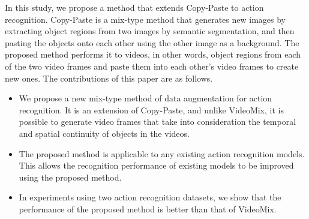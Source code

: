 In this study, we propose a method that extends Copy-Paste \cite{CopyPaste} to action recognition.
Copy-Paste is a mix-type method
that generates new images by extracting object regions from two images by semantic segmentation,
and then pasting the objects onto each other using the other image as a background.
The proposed method performs it to videos, in other words, object regions from each of the two video frames and paste them into each other's video frames to create new ones.
The contributions of this paper are as follows.
\begin{itemize}

\item We propose a new mix-type method of data augmentation for action recognition.
It is an extension of Copy-Paste, and unlike VideoMix, it is possible to generate video frames that take into consideration the temporal and spatial continuity of objects in the videos.

\item The proposed method is applicable to any existing action recognition models.
This allows the recognition performance of existing models
to be improved using the proposed method.

\item In experiments using two action recognition datasets,
we show that the performance of the proposed method 
is better than that of VideoMix.

\end{itemize}





